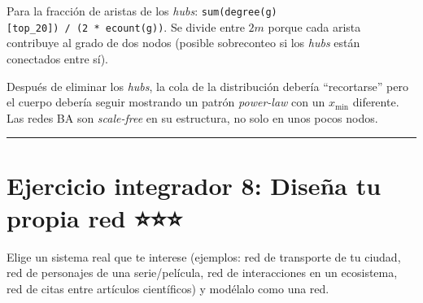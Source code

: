 \documentclass[
  letterpaper,
  DIV=11,
  numbers=noendperiod]{scrreprt}
\begin{document}
\begin{tcolorbox}[enhanced jigsaw, toprule=.15mm, colframe=quarto-callout-note-color-frame, coltitle=black, titlerule=0mm, colback=white, breakable, leftrule=.75mm, arc=.35mm, bottomtitle=1mm, toptitle=1mm, rightrule=.15mm, bottomrule=.15mm, left=2mm, title=\textcolor{quarto-callout-note-color}{\faInfo}\hspace{0.5em}{💡 Pista 1}, colbacktitle=quarto-callout-note-color!10!white, opacityback=0, opacitybacktitle=0.6]

Para la fracción de aristas de los \emph{hubs}:
\texttt{sum(degree(g){[}top\_20{]})\ /\ (2\ *\ ecount(g))}. Se divide
entre \(2m\) porque cada arista contribuye al grado de dos nodos
(posible sobreconteo si los \emph{hubs} están conectados entre sí).

\end{tcolorbox}

\begin{tcolorbox}[enhanced jigsaw, toprule=.15mm, colframe=quarto-callout-note-color-frame, coltitle=black, titlerule=0mm, colback=white, breakable, leftrule=.75mm, arc=.35mm, bottomtitle=1mm, toptitle=1mm, rightrule=.15mm, bottomrule=.15mm, left=2mm, title=\textcolor{quarto-callout-note-color}{\faInfo}\hspace{0.5em}{💡 Pista 2}, colbacktitle=quarto-callout-note-color!10!white, opacityback=0, opacitybacktitle=0.6]

Después de eliminar los \emph{hubs}, la cola de la distribución debería
``recortarse'' pero el cuerpo debería seguir mostrando un patrón
\emph{power-law} con un \(x_{\min}\) diferente. Las redes BA son
\emph{scale-free} en su estructura, no solo en unos pocos nodos.

\end{tcolorbox}

\begin{center}\rule{0.5\linewidth}{0.5pt}\end{center}

\section*{Ejercicio integrador 8: Diseña tu propia red
⭐⭐⭐}\label{ejercicio-integrador-8-diseuxf1a-tu-propia-red}


Elige un sistema real que te interese (ejemplos: red de transporte de tu
ciudad, red de personajes de una serie/película, red de interacciones en
un ecosistema, red de citas entre artículos científicos) y modélalo como
una red.
\end{document}
